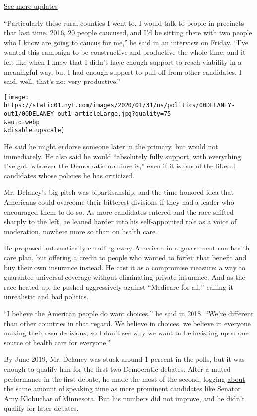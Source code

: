 \href{https://www.nytimes.com/2020/07/31/us/elections/biden-vs-trump.html?action=click\&pgtype=Article\&state=default\&region=MAIN_CONTENT_1\&context=storylines_live_updates}{See
more updates}

``Particularly these rural counties I went to, I would talk to people in
precincts that last time, 2016, 20 people caucused, and I'd be sitting
there with two people who I know are going to caucus for me,'' he said
in an interview on Friday. ``I've wanted this campaign to be
constructive and productive the whole time, and it felt like when I knew
that I didn't have enough support to reach viability in a meaningful
way, but I had enough support to pull off from other candidates, I said,
well, that's not very productive.''

\texttt{[image: https://static01.nyt.com/images/2020/01/31/us/politics/00DELANEY-out1/00DELANEY-out1-articleLarge.jpg?quality=75\\\&auto=webp\\\&disable=upscale]}

He said he might endorse someone later in the primary, but would not
immediately. He also said he would ``absolutely fully support, with
everything I've got, whoever the Democratic nominee is,'' even if it is
one of the liberal candidates whose policies he has criticized.

Mr. Delaney's big pitch was bipartisanship, and the time-honored idea
that Americans could overcome their bitterest divisions if they had a
leader who encouraged them to do so. As more candidates entered and the
race shifted sharply to the left, he leaned harder into his
self-appointed role as a voice of moderation, nowhere more so than on
health care.

He proposed
\href{https://www.nytimes.com/2019/06/26/us/politics/john-delaney-health-care.html}{automatically
enrolling every American in a government-run health care plan}, but
offering a credit to people who wanted to forfeit that benefit and buy
their own insurance instead. He cast it as a compromise measure: a way
to guarantee universal coverage without eliminating private insurance.
And as the race heated up, he pushed aggressively against ``Medicare for
all,'' calling it unrealistic and bad politics.

``I believe the American people do want choices,'' he said in 2018.
``We're different than other countries in that regard. We believe in
choices, we believe in everyone making their own decisions, so I don't
see why we want to be insisting upon one source of health care for
everyone.''

By June 2019, Mr. Delaney was stuck around 1 percent in the polls, but
it was enough to qualify him for the first two Democratic debates. After
a muted performance in the first debate, he made the most of the second,
logging
\href{https://www.nytimes.com/interactive/2019/07/30/us/elections/debate-speaking-time.html}{about
the same amount of speaking time} as more prominent candidates like
Senator Amy Klobuchar of Minnesota. But his numbers did not improve, and
he didn't qualify for later debates.

